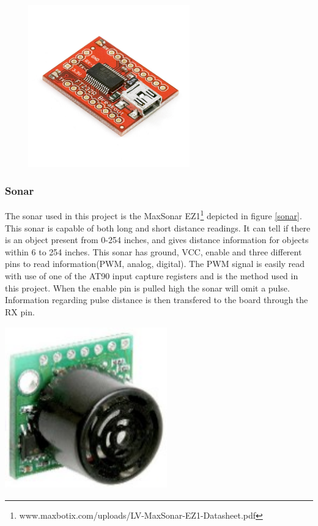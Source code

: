 \begin{minipage}{6.5in}
  \centering
    \includegraphics[width=90mm, height= 70mm]{imageSources/usbUART.png}
  
  \label{usbUART}
\end{minipage}


\subsubsection{Sonar}
 The sonar used in this project is the MaxSonar EZ1\footnote{www.maxbotix.com/uploads/LV-MaxSonar-EZ1-Datasheet.pdf} depicted in figure \ref{sonar}. This sonar is capable of both long and short distance readings. It can tell if there is an object present from 0-254 inches, and gives distance information for objects within 6 to 254 inches. This sonar has ground, VCC, enable and three different pins to read information(PWM, analog, digital). The PWM signal is easily read with use of one of the AT90 input capture registers and is the method used in this project.  When the enable pin is pulled high the sonar will omit a pulse. Information regarding pulse distance is then transfered to the board through the RX pin. 

\begin{minipage}{6.5in}
  \centering
    \includegraphics[width=70mm, height= 70mm]{imageSources/sonar.png}

  \label{sonar}
\end{minipage}
\vspace{0.1in}

